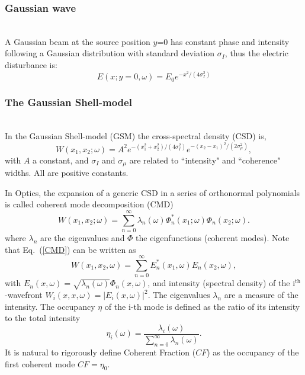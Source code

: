 \documentclass{iopconfser}
\begin{document}
\subsubsection{Gaussian wave}\hspace*{\fill} \\
A Gaussian beam at the source position $y$=0 has constant phase and intensity following a Gaussian distribution with standard deviation $\sigma_I$, thus the electric disturbance is: 
\begin{equation}
\label{eq:gaussianSource}
    E(x;y=0,\omega) = E_0 e^{-x^2 / (4 \sigma_I^2)}
\end{equation}

\subsubsection{The Gaussian Shell-model}\hspace*{\fill} \\
In the Gaussian Shell-model (GSM) the cross-spectral density (CSD) is, 
\begin{equation}
W(x_1,x_2;\omega) = A^2 e^{-(x_1^2+x_2^2)/(4 \sigma_I^2)} e^{-(x_2-x_1)^2/(2 \sigma_{\mu}^2)},
\label{GS_CSD}
\end{equation} 
with $A$ a constant, and $\sigma_I$ and $\sigma_\mu$ are related to ``intensity" and  ``coherence" widths. All are positive constants. 

In Optics, the expansion of a generic CSD in a series of orthonormal polynomials is called coherent mode decomposition (CMD)  
\cite{mandel_wolf}
\begin{equation}
W(x_1,x_2;\omega) = \sum_{n=0}^{\infty} \lambda_n(\omega) \Phi_n^*(x_1;\omega) \Phi_n(x_2;\omega). 
\label{CMD}
\end{equation}
where $\lambda_n$ are the eigenvalues and $\Phi$ the eigenfunctions (coherent modes). 
Note that Eq.~(\ref{CMD}) can be written as 
\begin{equation}
W(x_1,x_2,\omega) = \sum_{n=0}^{\infty} E_n^*(x_1,\omega) E_n(x_2,\omega), 
\end{equation} with $E_n(x, \omega) = \sqrt{\lambda_n(\omega)} \Phi_n(x,\omega)$, and intensity (spectral density) of the i$^\text{th}$-wavefront $W_i(x, x, \omega) =  |E_i(x, \omega)|^2$.
The eigenvalues $\lambda_n$ are a measure of the intensity.
The occupancy $\eta$ of the i-th mode is defined as the ratio of its intensity to the total intensity 
\begin{equation}
\eta_i(\omega) = \frac{\lambda_i(\omega)}{\sum_{n=0}^{\infty} \lambda_n(\omega)}.
\end{equation}
It is natural to rigorously define Coherent Fraction ($CF$) as the occupancy of the first coherent mode $CF=\eta_0$.
\end{document}
